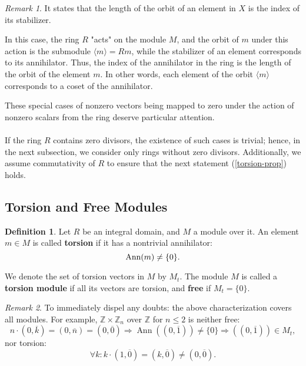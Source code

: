 \documentclass{article}
\newif\ifusemulticols
\newcommand\newterm[1]{\textbf{#1}}
\theoremstyle{definition}
\newtheorem{deff}{Definition}
\theoremstyle{remark}
\newtheorem*{note}{Remark}
\theoremstyle{plain}
\theoremstyle{plain}
\newenvironment{mymulticols}
    { \ifusemulticols \begin{multicols}{2} \fi }
    { \ifusemulticols \end{multicols} \fi }
\DeclareMathOperator{\Ann}{Ann}
\newcommand{\Z}{\mathbb{Z}}
\begin{document}
\begin{mymulticols}
\begin{note}
    It states that the length of the orbit of an element in $X$ is the index of its stabilizer.

    In this case, the ring $R$ "acts" on the module $M$, and the orbit of $m$ under this action is
    the submodule $\langle m \rangle = Rm$, while the stabilizer of an element corresponds to its
    annihilator.
    Thus, the index of the annihilator in the ring is the length of the orbit of the element $m$.
    In other words, each element of the orbit $\langle m \rangle$ corresponds to a coset of the
    annihilator.
\end{note}

These special cases of nonzero vectors being mapped to zero under the action of nonzero scalars from
the ring deserve particular attention.\\\\
If the ring $R$ contains zero divisors, the existence of such cases is trivial; hence, in the next
subsection, we consider only rings without zero divisors.
Additionally, we assume commutativity of $R$ to ensure that the next statement 
(\ref{torsion-prop}) holds.

\subsection{Torsion and Free Modules}
\begin{deff}
    Let $R$ be an integral domain, and $M$ a module over it. 
    An element $m \in M$ is called \newterm{torsion} if it has a nontrivial annihilator: 
    $$\textnormal{Ann}(m) \not= \{0\}.$$

    We denote the set of torsion vectors in $M$ by $M_t$. 
    The module $M$ is called a \newterm{torsion module} if all its vectors are torsion, and
    \newterm{free} if $M_t = \{0\}$.
\end{deff}

\begin{note}
    To immediately dispel any doubts: the above characterization covers all modules.
%
    For example, $\Z \times \Z_n$ over $\Z$ for $n \leq 2$ is neither free:
    $$n \cdot (0, \overline{k}) = (0, \overline{n}) = (0, \overline{0}) \Rightarrow \Ann \left((0, \overline{1})\right) \neq \{0\} \Rightarrow \left((0, \overline{1})\right) \in M_t,$$
    nor torsion:
    $$\forall k: k \cdot (1, \overline{0}) = (k, \overline{0}) \neq (0, \overline{0}).$$

\end{note}


\end{mymulticols}
\end{document}
